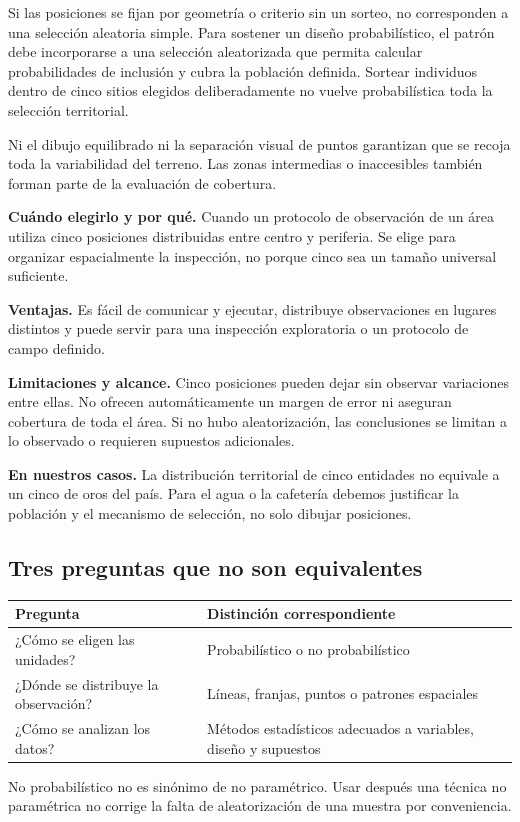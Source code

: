 \documentclass[11pt,letterpaper]{article}
\begin{document}
Si las posiciones se fijan por geometría o criterio sin un sorteo, no corresponden a una selección aleatoria simple. Para sostener un diseño probabilístico, el patrón debe incorporarse a una selección aleatorizada que permita calcular probabilidades de inclusión y cubra la población definida. Sortear individuos dentro de cinco sitios elegidos deliberadamente no vuelve probabilística toda la selección territorial.

Ni el dibujo equilibrado ni la separación visual de puntos garantizan que se recoja toda la variabilidad del terreno. Las zonas intermedias o inaccesibles también forman parte de la evaluación de cobertura.

\textbf{Cuándo elegirlo y por qué.} Cuando un protocolo de observación de un área utiliza cinco posiciones distribuidas entre centro y periferia. Se elige para organizar espacialmente la inspección, no porque cinco sea un tamaño universal suficiente.

\textbf{Ventajas.} Es fácil de comunicar y ejecutar, distribuye observaciones en lugares distintos y puede servir para una inspección exploratoria o un protocolo de campo definido.

\textbf{Limitaciones y alcance.} Cinco posiciones pueden dejar sin observar variaciones entre ellas. No ofrecen automáticamente un margen de error ni aseguran cobertura de toda el área. Si no hubo aleatorización, las conclusiones se limitan a lo observado o requieren supuestos adicionales.

\textbf{En nuestros casos.} La distribución territorial de cinco entidades no equivale a un cinco de oros del país. Para el agua o la cafetería debemos justificar la población y el mecanismo de selección, no solo dibujar posiciones.

\subsection{Tres preguntas que no son equivalentes}
\begin{longtable}{p{}p{}}
\toprule\rowcolor{cabecera} Pregunta & Distinción correspondiente \\ \midrule
¿Cómo se eligen las unidades? & Probabilístico o no probabilístico \\
¿Dónde se distribuye la observación? & Líneas, franjas, puntos o patrones espaciales \\
¿Cómo se analizan los datos? & Métodos estadísticos adecuados a variables, diseño y supuestos \\
\bottomrule
\end{longtable}
No probabilístico no es sinónimo de no paramétrico. Usar después una técnica no paramétrica no corrige la falta de aleatorización de una muestra por conveniencia.
\clearpage
\end{document}
